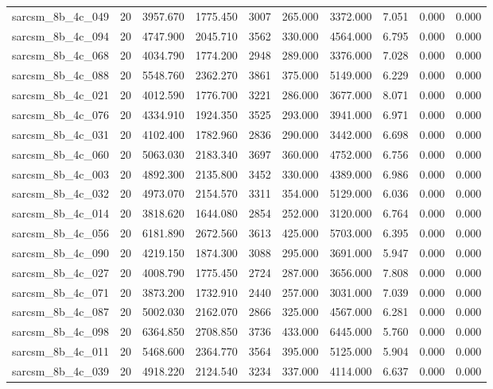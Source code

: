 \begin{tabular}{lrrrrrrrrr}
sarcsm\_8b\_4c\_049 & 20 & 3957.670 & 1775.450 & 3007 & 265.000 & 3372.000 & 7.051 & 0.000 & 0.000 \\
sarcsm\_8b\_4c\_094 & 20 & 4747.900 & 2045.710 & 3562 & 330.000 & 4564.000 & 6.795 & 0.000 & 0.000 \\
sarcsm\_8b\_4c\_068 & 20 & 4034.790 & 1774.200 & 2948 & 289.000 & 3376.000 & 7.028 & 0.000 & 0.000 \\
sarcsm\_8b\_4c\_088 & 20 & 5548.760 & 2362.270 & 3861 & 375.000 & 5149.000 & 6.229 & 0.000 & 0.000 \\
sarcsm\_8b\_4c\_021 & 20 & 4012.590 & 1776.700 & 3221 & 286.000 & 3677.000 & 8.071 & 0.000 & 0.000 \\
sarcsm\_8b\_4c\_076 & 20 & 4334.910 & 1924.350 & 3525 & 293.000 & 3941.000 & 6.971 & 0.000 & 0.000 \\
sarcsm\_8b\_4c\_031 & 20 & 4102.400 & 1782.960 & 2836 & 290.000 & 3442.000 & 6.698 & 0.000 & 0.000 \\
sarcsm\_8b\_4c\_060 & 20 & 5063.030 & 2183.340 & 3697 & 360.000 & 4752.000 & 6.756 & 0.000 & 0.000 \\
sarcsm\_8b\_4c\_003 & 20 & 4892.300 & 2135.800 & 3452 & 330.000 & 4389.000 & 6.986 & 0.000 & 0.000 \\
sarcsm\_8b\_4c\_032 & 20 & 4973.070 & 2154.570 & 3311 & 354.000 & 5129.000 & 6.036 & 0.000 & 0.000 \\
sarcsm\_8b\_4c\_014 & 20 & 3818.620 & 1644.080 & 2854 & 252.000 & 3120.000 & 6.764 & 0.000 & 0.000 \\
sarcsm\_8b\_4c\_056 & 20 & 6181.890 & 2672.560 & 3613 & 425.000 & 5703.000 & 6.395 & 0.000 & 0.000 \\
sarcsm\_8b\_4c\_090 & 20 & 4219.150 & 1874.300 & 3088 & 295.000 & 3691.000 & 5.947 & 0.000 & 0.000 \\
sarcsm\_8b\_4c\_027 & 20 & 4008.790 & 1775.450 & 2724 & 287.000 & 3656.000 & 7.808 & 0.000 & 0.000 \\
sarcsm\_8b\_4c\_071 & 20 & 3873.200 & 1732.910 & 2440 & 257.000 & 3031.000 & 7.039 & 0.000 & 0.000 \\
sarcsm\_8b\_4c\_087 & 20 & 5002.030 & 2162.070 & 2866 & 325.000 & 4567.000 & 6.281 & 0.000 & 0.000 \\
sarcsm\_8b\_4c\_098 & 20 & 6364.850 & 2708.850 & 3736 & 433.000 & 6445.000 & 5.760 & 0.000 & 0.000 \\
sarcsm\_8b\_4c\_011 & 20 & 5468.600 & 2364.770 & 3564 & 395.000 & 5125.000 & 5.904 & 0.000 & 0.000 \\
sarcsm\_8b\_4c\_039 & 20 & 4918.220 & 2124.540 & 3234 & 337.000 & 4114.000 & 6.637 & 0.000 & 0.000 \\

\end{tabular}
